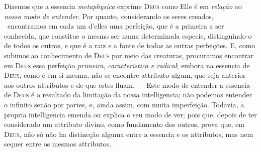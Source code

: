 {Dizemos que a essencia \emph{metaphysica} exprime \textsc{Deus} como Elle é em
\emph{relação} ao \emph{nosso modo de entender}. Por quanto, considerando os seres
creados, ~encontramos em cada um d'elles uma perfeição, que é a primeira a ser
conhecida, que constitue o mesmo ser numa determinada especie, distinguindo-o de todos os
outros, e que é a raiz e a fonte de todas as outras perfeições. E, como subimos ao
conhecimento de \textsc{Deus} por meio das creaturas, procuramos encontrar em
\textsc{Deus} essa perfeição \emph{primeira}, \emph{caracteristica e radical}; embora na
essencia de \textsc{Deus}, como é em si mesma, não se encontre attributo algum, que seja
anterior aos outros attributos e de que estes fluam. --- Este modo de entender a essencia
de \textsc{Deus} é o resultado da limitação da nossa intelligencia; não podemos entender o
infinito senão por partes, e, ainda assim, com muita imperfeição. Todavia, a propria
intelligencia emenda ou explica o seu modo de ver; pois que, depois de ter considerado um
attributo divino, como fundamento dos outros, prova que, em \textsc{Deus}, não só não ha
distincção alguma entre a essencia e os attributos, mas nem sequer entre os mesmos
attributos.}.


